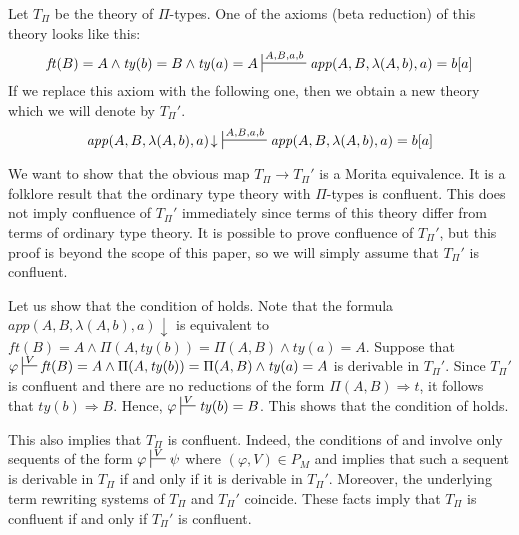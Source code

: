 \documentclass[reqno]{amsart}
\theoremstyle{definition}
\theoremstyle{remark}
\newcommand{\app}{\mathit{app}}
\newcommand{\ft}{\mathit{ft}}
\newcommand{\ty}{\mathit{ty}}
\numberwithin{figure}{section}
\begin{document}
\begin{example}
Let $T_\Pi$ be the theory of $\Pi$-types.
One of the axioms (beta reduction) of this theory looks like this:
\[ \ft(B) = A \land \ty(b) = B \land \ty(a) = A \sststile{}{A,B,a,b} \app(A,B,\lambda(A,b),a) = b[a] \]
If we replace this axiom with the following one, then we obtain a new theory which we will denote by $T_\Pi'$.
\[ \app(A,B,\lambda(A,b),a)\!\downarrow\ \sststile{}{A,B,a,b} \app(A,B,\lambda(A,b),a) = b[a] \]

We want to show that the obvious map $T_\Pi \to T_\Pi'$ is a Morita equivalence.
It is a folklore result that the ordinary type theory with $\Pi$-types is confluent.
This does not imply confluence of $T_\Pi'$ immediately since terms of this theory differ from terms of ordinary type theory.
It is possible to prove confluence of $T_\Pi'$, but this proof is beyond the scope of this paper, so we will simply assume that $T_\Pi'$ is confluent.

Let us show that the condition of  holds.
Note that the formula $\app(A,B,\lambda(A,b),a)\!\downarrow$ is equivalent to $\ft(B) = A \land \Pi(A,\ty(b)) = \Pi(A,B) \land \ty(a) = A$.
Suppose that $\varphi \sststile{}{V} \ft(B) = A \land \Pi(A,\ty(b)) = \Pi(A,B) \land \ty(a) = A$ is derivable in $T_\Pi'$.
Since $T_\Pi'$ is confluent and there are no reductions of the form $\Pi(A,B) \Rightarrow t$, it follows that $\ty(b) \Rightarrow B$.
Hence, $\varphi \sststile{}{V} \ty(b) = B$.
This shows that the condition of  holds.

This also implies that $T_\Pi$ is confluent.
Indeed, the conditions of  and  involve only sequents of the form $\varphi \sststile{}{V} \psi$ where $(\varphi,V) \in P_M$
and  implies that such a sequent is derivable in $T_\Pi$ if and only if it is derivable in $T_\Pi'$.
Moreover, the underlying term rewriting systems of $T_\Pi$ and $T_\Pi'$ coincide.
These facts imply that $T_\Pi$ is confluent if and only if $T_\Pi'$ is confluent.
\end{example}
\end{document}
